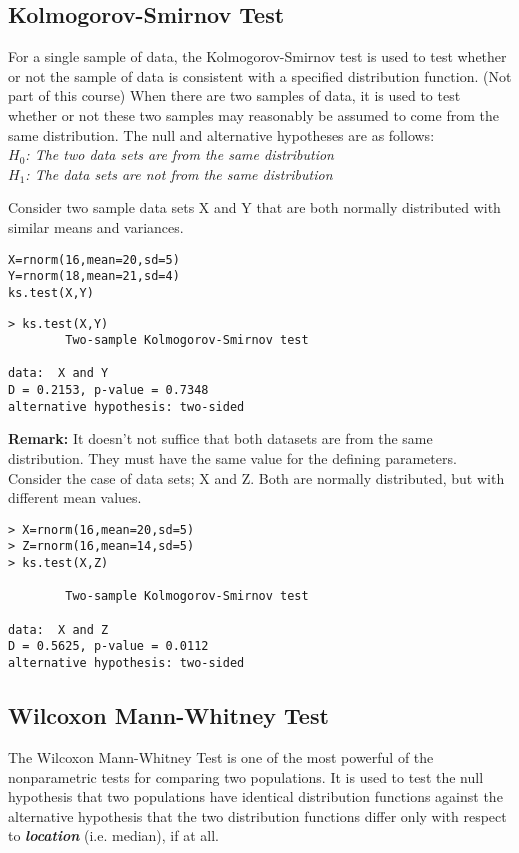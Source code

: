 \documentclass[a4paper,12pt]{article}
\begin{document}
\subsection{Kolmogorov-Smirnov Test}

For a single sample of data, the Kolmogorov-Smirnov test is used to test whether or not the sample of data is consistent with a specified distribution function. (Not part of this course)
When there are two samples of data, it is used to test whether or not these two samples may reasonably be assumed to come from the same distribution.
The null and alternative hypotheses are as follows:\\
\emph{
$H_0$: The two data sets are from the same distribution\\
$H_1$: The data sets are not from the same distribution\\
}

\noindent Consider two sample data sets X and Y that are both normally distributed with similar means and variances.
\begin{framed}
\begin{verbatim}
X=rnorm(16,mean=20,sd=5)
Y=rnorm(18,mean=21,sd=4)
ks.test(X,Y)
\end{verbatim}
\end{framed}
\begin{verbatim}
> ks.test(X,Y)
        Two-sample Kolmogorov-Smirnov test

data:  X and Y
D = 0.2153, p-value = 0.7348
alternative hypothesis: two-sided
\end{verbatim}

\noindent \textbf{Remark:} It doesn’t not suffice that both datasets are from the same distribution. They must have the same value for the defining parameters. Consider the case of data sets; X and Z. Both are normally distributed, but with different mean values.
\begin{framed}
\begin{verbatim}
> X=rnorm(16,mean=20,sd=5)
> Z=rnorm(16,mean=14,sd=5)
> ks.test(X,Z)

        Two-sample Kolmogorov-Smirnov test

data:  X and Z
D = 0.5625, p-value = 0.0112
alternative hypothesis: two-sided
\end{verbatim}
\end{framed}

\subsection{Wilcoxon Mann-Whitney Test}
The Wilcoxon Mann-Whitney Test is one of the most powerful of the nonparametric tests for comparing two populations. It is used to test the null hypothesis that two populations have identical distribution functions against the alternative hypothesis that the two distribution functions differ only with respect to \textbf{\emph{location}} (i.e. median), if at all.
\end{document}
